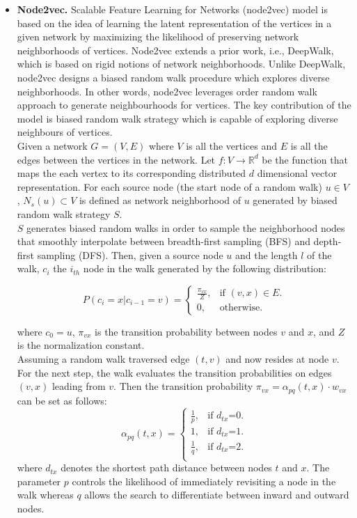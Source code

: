 \begin{itemize}
\item \textbf{Node2vec.}
Scalable Feature Learning for Networks (node2vec) model is based on the idea of learning the latent representation of the vertices in a given network by maximizing the likelihood of preserving network neighborhoods of vertices. Node2vec extends a prior work, i.e., DeepWalk, which is based on rigid notions of network neighborhoods. Unlike DeepWalk, node2vec designs a biased random walk procedure which explores diverse neighborhoods.  In other words, node2vec leverages  order random walk approach to generate neighbourhoods for vertices. The key contribution of the model is biased random walk strategy which is capable of exploring diverse neighbours of vertices.\\  
Given a network $G = (V, E)$ where $V$ is all the vertices and $E$ is all the edges between the vertices in the network. Let $f : V \to \mathbb{R}^d$ be the function that maps the each vertex to its corresponding distributed $d$ dimensional vector representation. For each source node (the start node of a random walk) $u\in V$ , $N_s(u) \subset V$ is defined as network neighborhood of $u$ generated by biased random walk strategy $S$.\\
$S$ generates biased random walks in order to sample the neighborhood nodes that smoothly interpolate between breadth-first sampling (BFS) and depth-first sampling (DFS). 
Then, given a source node $u$ and the length $l$ of the walk, $c_i$ the $i_{th}$ node in the walk generated by the following distribution:


\begin{equation}
    P(c_i = x| c_{i-1}=v )= \begin{cases}
    \frac{\pi_{vx} }{Z}, & \text{if $(v,x)\in E$}.\\
    0, & \text{otherwise}.
  \end{cases}
\end{equation}

where $c_0 =u$, $\pi_{vx}$ is the transition probability between nodes $v$ and $x$, and $Z$ is the normalization constant. \\
Assuming a random walk traversed edge $(t, v)$ and now resides at node $v$. For the next step, the walk evaluates the transition probabilities on edges $(v,x)$ leading from $v$. Then the transition probability $\pi_{vx}=\alpha_{pq}(t,x)\cdot w_{vx}$ can be set as follows:
\begin{equation}
    \alpha_{pq}(t,x)= \begin{cases}
    \frac{1}{p}, & \text{if $d_{tx}$=0}.\\
    1, & \text{if $d_{tx}$=1}.\\
    \frac{1}{q}, & \text{if $d_{tx}$=2}.\\
  \end{cases}
\end{equation}
where $d_{tx}$ denotes the shortest path distance between nodes $t$ and $x$. The parameter $p$ controls the likelihood of immediately revisiting a node in the walk whereas $q$ allows the search to differentiate between inward and outward nodes.%


\end{itemize}
